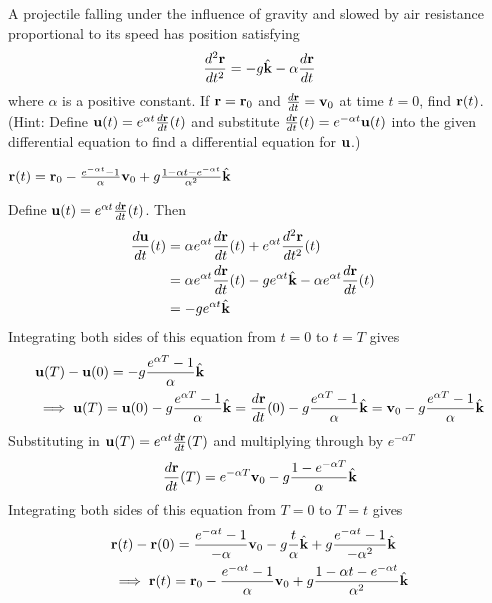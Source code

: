 \begin{question}A projectile falling under the influence of gravity and slowed
by air resistance proportional to its speed has position satisfying
$$
\frac{d^2\mathbf{r}}{dt^2}=-g\hat{\mathbf{k}}-\alpha\frac{d\mathbf{r}}{dt}
$$
where $\alpha$ is a positive constant. If $\mathbf{r}=\mathbf{r}_0$ and 
$\frac{d\mathbf{r}}{dt}=\mathbf{v}_0$ at time $t=0$, find $\mathbf{r}(t)$.
(Hint: Define $\mathbf{u}(t)=e^{\alpha t}\frac{d\mathbf{r}}{dt}(t)$ and substitute
$\frac{d\mathbf{r}}{dt}(t)=e^{-\alpha t}\mathbf{u}(t)$ into the given 
differential equation to find a differential equation for $\mathbf{u}$.)
\end{question}


\begin{answer}
$\mathbf{r}(t)=\mathbf{r}_0-\frac{e^{-\alpha t}-1}{\alpha}\mathbf{v}_0
+g\frac{1-\alpha t-e^{-\alpha t}}{\alpha^2}\hat{\mathbf{k}}$
\end{answer}
\begin{solution}
Define $\mathbf{u}(t)=e^{\alpha t}\frac{d\mathbf{r}}{dt}(t)$. Then
\begin{align*}
\frac{d\mathbf{u}}{dt}(t)&=\alpha e^{\alpha t}\frac{d\mathbf{r}}{dt}(t)
+e^{\alpha t}\frac{d^2\mathbf{r}}{dt^2}(t)\cr
&=\alpha e^{\alpha t}\frac{d\mathbf{r}}{dt}(t)
-ge^{\alpha t}\hat{\mathbf{k}}
-\alpha e^{\alpha t}\frac{d\mathbf{r}}{dt}(t)\cr
&=-ge^{\alpha t}\hat{\mathbf{k}}\cr
\end{align*}
Integrating both sides of this equation from $t=0$ to $t=T$ gives
\begin{align*}
&\mathbf{u}(T)-\mathbf{u}(0)=-g\frac{e^{\alpha T}-1}{\alpha}\hat{\mathbf{k}} \\
&\implies 
\mathbf{u}(T)=\mathbf{u}(0)-g\frac{e^{\alpha T}-1}{\alpha}\hat{\mathbf{k}}
=\frac{d\mathbf{r}}{dt}(0)-g\frac{e^{\alpha T}-1}{\alpha}\hat{\mathbf{k}}
=\mathbf{v}_0-g\frac{e^{\alpha T}-1}{\alpha}\hat{\mathbf{k}}
\end{align*}
Substituting in $\mathbf{u}(T)=e^{\alpha t}\frac{d\mathbf{r}}{dt}(T)$ and multiplying
through by $e^{-\alpha T}$
$$
\frac{d\mathbf{r}}{dt}(T)
=e^{-\alpha T}\mathbf{v}_0-g\frac{1-e^{-\alpha T}}{\alpha}\hat{\mathbf{k}}
$$
Integrating both sides of this equation from $T=0$ to $T=t$ gives
\begin{align*}
&\mathbf{r}(t)-\mathbf{r}(0)
=\frac{e^{-\alpha t}-1}{-\alpha}\mathbf{v}_0-g\frac{ t}{\alpha}\hat{\mathbf{k}}
+g\frac{e^{-\alpha t}-1}{-\alpha^2}\hat{\mathbf{k}} \\
&\implies \mathbf{r}(t)=\mathbf{r}_0-\frac{e^{-\alpha t}-1}{\alpha}\mathbf{v}_0
+g\frac{1-\alpha t-e^{-\alpha t}}{\alpha^2}\hat{\mathbf{k}}
\end{align*}
\end{solution}


